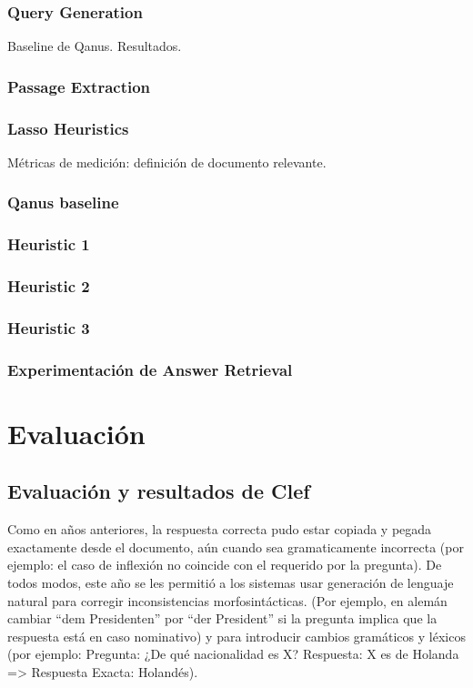 \subsubsection{Query Generation}
\falta
Baseline de Qanus.
Resultados.
\subsubsection{Passage Extraction}
\falta
\subsubsection{Lasso Heuristics}
Métricas de medición: definición de documento relevante.
\subsubsection{Qanus baseline}
\falta
\subsubsection{Heuristic 1}
\falta
\subsubsection{Heuristic 2}
\falta
\subsubsection{Heuristic 3}
\falta
\subsubsection{Experimentación de Answer Retrieval}
\falta


\section{Evaluación}
\falta
\subsection{Evaluación y resultados de Clef}
\falta
Como en años anteriores, la respuesta correcta pudo estar copiada y pegada exactamente desde el documento, aún cuando sea gramaticamente incorrecta (por ejemplo: el caso de inflexión no coincide con el requerido por la pregunta). De todos modos, este año se les permitió a los sistemas usar generación de lenguaje natural para corregir inconsistencias morfosintácticas. (Por ejemplo, en alemán cambiar “dem Presidenten” por “der President” si la pregunta implica que la respuesta está en caso nominativo) y para introducir cambios gramáticos y léxicos (por ejemplo: Pregunta: ¿De qué nacionalidad es X? Respuesta: X es de Holanda => Respuesta Exacta: Holandés).



